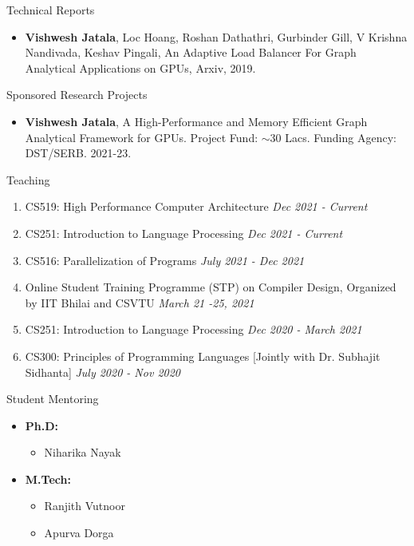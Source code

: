 \documentclass{resume} %
\begin{document}
\begin{rSection}{Technical Reports}
\begin{itemize}
\item \textbf{Vishwesh Jatala}, Loc Hoang, Roshan Dathathri, Gurbinder Gill, V Krishna Nandivada, Keshav Pingali, An Adaptive Load Balancer For Graph Analytical Applications on GPUs, Arxiv, 2019. 
\end{itemize}
\end{rSection}


\begin{rSection}{Sponsored Research Projects}
	\begin{itemize}
		\item \textbf{Vishwesh Jatala}, A High-Performance and Memory Efficient Graph Analytical Framework for GPUs. Project Fund: $\sim$30 Lacs. Funding Agency: DST/SERB. 2021-23.
	\end{itemize}
\end{rSection}

\begin{rSection}{Teaching}
	\begin{enumerate}
		\item CS519: High Performance Computer Architecture  \hfill {\em Dec 2021 - Current}	
		\item CS251: Introduction to Language Processing \hfill {\em Dec 2021 - Current}
		\item CS516: Parallelization of Programs  \hfill {\em July 2021 - Dec 2021}	
		\item Online Student Training Programme (STP) on Compiler Design, Organized by IIT Bhilai and CSVTU  \hfill {\em March 21 -25, 2021}	
		\item CS251: Introduction to Language Processing \hfill {\em Dec 2020 - March 2021}
		\item CS300: Principles of Programming Languages [{\scriptsize Jointly with Dr. Subhajit Sidhanta}] \hfill {\em July 2020 - Nov 2020}
	\end{enumerate}
\end{rSection}


\begin{rSection}{Student Mentoring}
	\begin{itemize}
		\item \textbf{Ph.D:}
		\begin{itemize}
			\item Niharika Nayak
		\end{itemize}
		\item \textbf{M.Tech:}
		\begin{itemize}
			\item Ranjith Vutnoor
			\item Apurva Dorga
		\end{itemize}
	\end{itemize}
\end{rSection}
\end{document}
